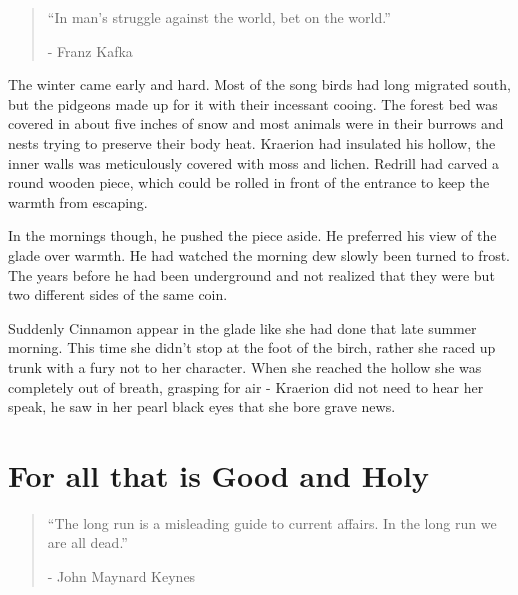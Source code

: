 \documentclass[smalldemyvopaper,11pt,twoside,onecolumn,openright,extrafontsizes]{memoir}
\begin{document}
\vspace{-1.3cm}
\begin{localsize}{10}
	\begin{quote}
		“In man's struggle against the world, bet on the world.”
		\begin{flushright}- Franz Kafka \end{flushright}
	\end{quote} 
\end{localsize}
\vspace{1cm}

The winter came early and hard. Most of the song birds had long migrated south, but the pidgeons made up for it with their incessant cooing. The forest bed was covered in about five inches of snow and most animals were in their burrows and nests trying to preserve their body heat. Kraerion had insulated his hollow, the inner walls was meticulously covered with moss and lichen. Redrill had carved a round wooden piece, which could be rolled in front of the entrance to keep the warmth from escaping.  

In the mornings though, he pushed the piece aside. He preferred his view of the glade over warmth. He had watched the morning dew slowly been turned to frost. The years before he had been underground and not realized that they were but two different sides of the same coin. 

Suddenly Cinnamon appear in the glade like she had done that late summer morning. This time she didn't stop at the foot of the birch, rather she raced up trunk with a fury not to her character. When she reached the hollow she was completely out of breath, grasping for air - Kraerion did not need to hear her speak, he saw in her pearl black eyes that she bore grave news.    


\chapter{For all that is Good and Holy}

\vspace{-1.3cm}
\begin{localsize}{10}
	\begin{quote}
		“The long run is a misleading guide to current affairs. In the long run we are all dead.” 
		\begin{flushright}- John Maynard Keynes \end{flushright}
	\end{quote} 
\end{localsize}
\vspace{1cm}
\end{document}

